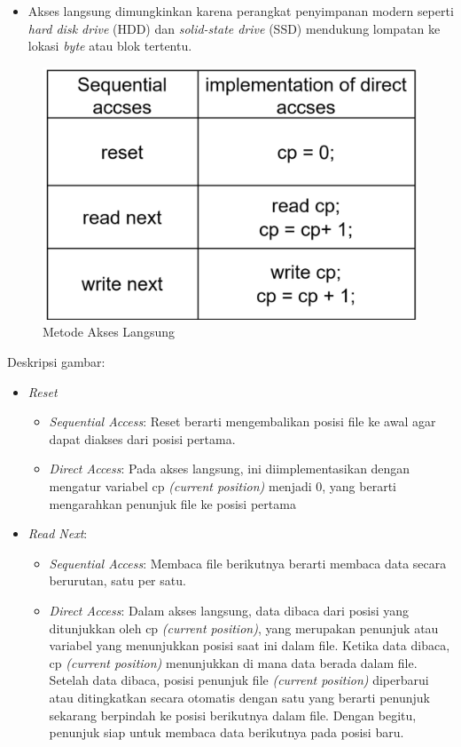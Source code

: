 \documentclass[12pt]{article}
\begin{document}
\begin{enumerate}
\begin{itemize}
        \item Akses langsung dimungkinkan karena perangkat penyimpanan modern seperti \textit{hard disk drive} (HDD) dan \textit{solid-state drive} (SSD) mendukung lompatan ke lokasi \textit{byte} atau blok tertentu.
    \end{itemize}

    \begin{figure}[h]
        \centering
        \includegraphics[width=0.5\linewidth]{assets/p2.png}
        \caption{Metode Akses Langsung}
        \label{fig:sequential-access}
    \end{figure}

    {Deskripsi gambar:}
     \begin{itemize}
        \item \textit{Reset}
        \begin{itemize}
            \item \textit{Sequential Access}: Reset berarti mengembalikan posisi file ke awal agar dapat diakses dari posisi pertama.
            
            \item \textit{Direct Access}: Pada akses langsung, ini diimplementasikan dengan mengatur variabel cp \textit{(current position)} menjadi 0, yang berarti mengarahkan penunjuk file ke posisi pertama
        
        \end{itemize}

        \item \textit{Read Next}:
        \begin{itemize}
        \item \textit{Sequential Access}: Membaca file berikutnya berarti membaca data secara berurutan, satu per satu.

        \item \textit{Direct Access}: Dalam akses langsung, data dibaca dari posisi yang ditunjukkan oleh cp \textit{(current position)}, yang merupakan penunjuk atau variabel yang menunjukkan posisi saat ini dalam file. Ketika data dibaca, cp \textit{(current position)} menunjukkan di mana data berada dalam file. Setelah data dibaca, posisi penunjuk file \textit{(current position)} diperbarui atau ditingkatkan secara otomatis dengan satu yang berarti penunjuk sekarang berpindah ke posisi berikutnya dalam file. Dengan begitu, penunjuk siap untuk membaca data berikutnya pada posisi baru.
        

\end{itemize}
\end{itemize}
\end{enumerate}
\end{document}
